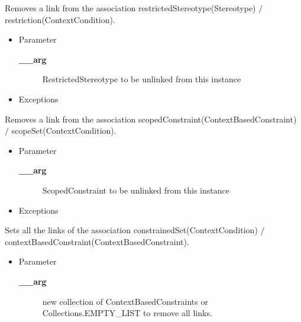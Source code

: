 \begin{desc}Removes a link from the association restrictedStereotype(Stereotype)
 $/$ restriction(ContextCondition).
\begin{itemize}
\item{Parameter
  \begin{description}
   \item[{\bf \_\_arg}]{RestrictedStereotype to be unlinked from this instance}
  \end{description}}
\end{itemize}
\begin{itemize}
\item{{Exceptions}
}
\end{itemize}
\end{desc}

\begin{desc}Removes a link from the association scopedConstraint(ContextBasedConstraint)
 $/$ scopeSet(ContextCondition).
\begin{itemize}
\item{Parameter
  \begin{description}
   \item[{\bf \_\_arg}]{ScopedConstraint to be unlinked from this instance}
  \end{description}}
\end{itemize}
\begin{itemize}
\item{{Exceptions}
}
\end{itemize}
\end{desc}

\begin{desc}Sets all the links of the association constrainedSet(ContextCondition)
 $/$ contextBasedConstraint(ContextBasedConstraint).
\begin{itemize}
\item{Parameter
  \begin{description}
   \item[{\bf \_\_arg}]{new collection of ContextBasedConstraints or Collections.EMPTY\_LIST to
        remove all links.}
  \end{description}}
\end{itemize}
\end{desc}

